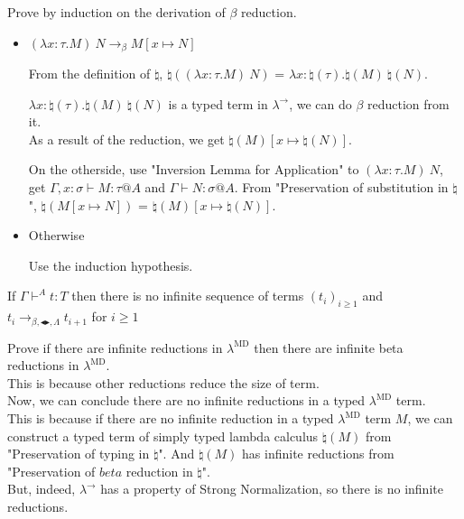 \documentclass[9pt, a4paper]{extarticle}
\theoremstyle{break}
\newcommand{\G}{\Gamma}
\newcommand{\V}{\vdash}
\newcommand{\TB}{\blacktriangleright}
\newcommand{\TBL}{\blacktriangleleft}
\begin{document}
Prove by induction on the derivation of $\beta$ reduction.

\begin{itemize}
    \newcommand{\R}{\longrightarrow_{\beta}}
    \item $(\lambda x:\tau.M)\ N \R M[x \mapsto N]$
    
        From the definition of $\natural$, $\natural((\lambda x:\tau.M)\ N)$ = $\lambda x:\natural(\tau).\natural(M)\ \natural(N)$.

        $\lambda x:\natural(\tau).\natural(M)\ \natural(N)$ is a typed term in $\lambda^\to$, we can do $\beta$ reduction from it.\\
        As a result of the reduction, we get $\natural(M)[x\mapsto\natural(N)]$.

        On the otherside, use "Inversion Lemma for Application" to $(\lambda x:\tau.M)\ N$, get $\G, x:\sigma \V M:\tau@A$ and $\G \V N:\sigma@A$.
        From "Preservation of substitution in $\natural$", $\natural(M[x \mapsto N])$ = $\natural(M)[x\mapsto\natural(N)]$.

    \item Otherwise
    
        Use the induction hypothesis.
\end{itemize}

\begin{thm}
    If $\G\V^A t:T$ then there is no infinite sequence of terms $(t_i)_{i\ge1}$ and $t_i \longrightarrow_{\beta, \TBL \TB,\Lambda} t_{i+1}$ for $i\ge 1$
\end{thm}

Prove if there are infinite reductions in $\lambda^{\text{MD}}$ then there are infinite beta reductions in $\lambda^{\text{MD}}$.\\
This is because other reductions reduce the size of term.\\

Now, we can conclude there are no infinite reductions in a typed $\lambda^{\text{MD}}$ term. \\

This is because if there are no infinite reduction in a typed $\lambda^{\text{MD}}$ term $M$,
we can construct a typed term of simply typed lambda calculus $\natural(M)$ from "Preservation of typing in $\natural$".
And $\natural(M)$ has infinite reductions from "Preservation of $beta$ reduction in $\natural$".\\

But, indeed, $\lambda^\to$ has a property of Strong Normalization, so there is no infinite reductions.
\end{document}
